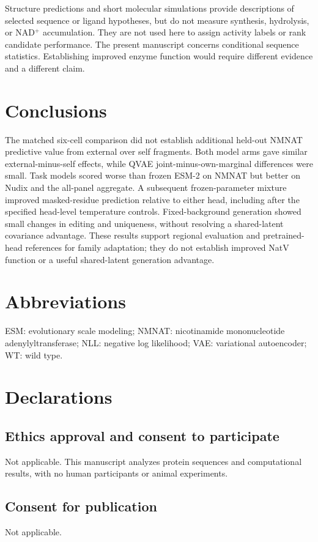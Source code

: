 \documentclass[referee,pdflatex,sn-vancouver-num]{sn-jnl}
\begin{document}
Structure predictions and short molecular simulations provide descriptions of selected sequence or ligand hypotheses, but do not measure synthesis, hydrolysis, or NAD$^+$ accumulation. They are not used here to assign activity labels or rank candidate performance. The present manuscript concerns conditional sequence statistics. Establishing improved enzyme function would require different evidence and a different claim.

\section{Conclusions}
The matched six-cell comparison did not establish additional held-out NMNAT predictive value from external over self fragments. Both model arms gave similar external-minus-self effects, while QVAE joint-minus-own-marginal differences were small. Task models scored worse than frozen ESM-2 on NMNAT but better on Nudix and the all-panel aggregate. A subsequent frozen-parameter mixture improved masked-residue prediction relative to either head, including after the specified head-level temperature controls. Fixed-background generation showed small changes in editing and uniqueness, without resolving a shared-latent covariance advantage. These results support regional evaluation and pretrained-head references for family adaptation; they do not establish improved NatV function or a useful shared-latent generation advantage.

\section*{Abbreviations}
ESM: evolutionary scale modeling; NMNAT: nicotinamide mononucleotide adenylyltransferase; NLL: negative log likelihood; VAE: variational autoencoder; WT: wild type.

\section*{Declarations}
\subsection*{Ethics approval and consent to participate}
Not applicable. This manuscript analyzes protein sequences and computational results, with no human participants or animal experiments.
\subsection*{Consent for publication}
Not applicable.
\end{document}
